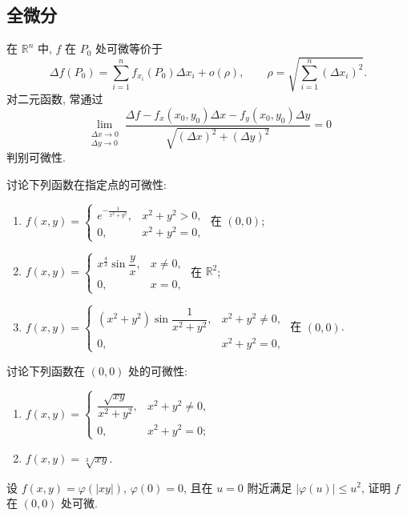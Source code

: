\documentclass[../数学分析培优讲义.tex]{subfiles}
\begin{document}
\newpage

\subsection{全微分}

在 $\mathbb{R}^n$ 中, $f$ 在 $P_0$ 处可微等价于
\[
    \Delta f(P_0)=\sum\limits_{i=1}^n f_{x_i}(P_0)\Delta x_i+o(\rho),
    \qquad
    \rho=\sqrt{\sum\limits_{i=1}^n(\Delta x_i)^2}.
\]
对二元函数, 常通过
\[
    \lim\limits_{\substack{\Delta x\to0\\\Delta y\to0}}
    \dfrac{\Delta f-f_x(x_0,y_0)\Delta x-f_y(x_0,y_0)\Delta y}
    {\sqrt{(\Delta x)^2+(\Delta y)^2}}=0
\]
判别可微性.

\begin{example}
讨论下列函数在指定点的可微性:
\begin{enumerate}[label=(\arabic*)]
    \item $\displaystyle f(x,y)=\begin{cases}e^{-\frac{1}{x^2+y^2}},&x^2+y^2>0,\\0,&x^2+y^2=0,\end{cases}$ 在 $(0,0)$;
    \item $\displaystyle f(x,y)=\begin{cases}x^{\frac{4}{3}}\sin\dfrac{y}{x},&x\ne0,\\0,&x=0,\end{cases}$ 在 $\mathbb{R}^2$;
    \item $\displaystyle f(x,y)=\begin{cases}(x^2+y^2)\sin\dfrac{1}{x^2+y^2},&x^2+y^2\ne0,\\0,&x^2+y^2=0,\end{cases}$ 在 $(0,0)$.
\end{enumerate}
\end{example}
\exampleblank

\begin{example}
讨论下列函数在 $(0,0)$ 处的可微性:
\begin{enumerate}[label=(\arabic*)]
    \item $\displaystyle f(x,y)=\begin{cases}\dfrac{\sqrt{xy}}{x^2+y^2},&x^2+y^2\ne0,\\0,&x^2+y^2=0;\end{cases}$
    \item $f(x,y)=\sqrt[3]{xy}$.
\end{enumerate}
\end{example}
\exampleblank

\begin{example}
设 $f(x,y)=\varphi(|xy|)$, $\varphi(0)=0$, 且在 $u=0$ 附近满足 $|\varphi(u)|\leq u^2$, 证明 $f$ 在 $(0,0)$ 处可微.
\end{example}
\exampleblank
\end{document}
